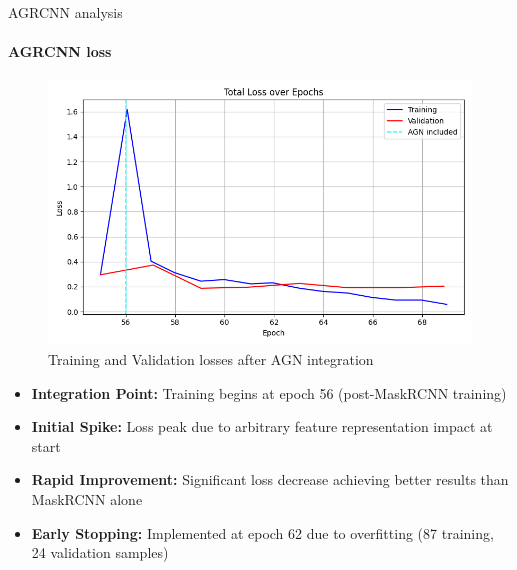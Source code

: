 \documentclass[8pt,aspectratio=169,xcolor=dvipsnames]{beamer}
\begin{document}
\begin{frame}{AGRCNN analysis}
\framesubtitle{AGRCNN loss}
\begin{figure}
    \centering
    \includegraphics[width=0.5\linewidth]{agn_loss.png}
    \caption{Training and Validation losses after AGN integration}
    \label{fig:agn_loss}
\end{figure}
\begin{itemize}
    \item \textbf{Integration Point:} Training begins at epoch 56 (post-MaskRCNN training)
    \item \textbf{Initial Spike:} Loss peak due to arbitrary feature representation impact at start
    \item \textbf{Rapid Improvement:} Significant loss decrease achieving better results than MaskRCNN alone
    \item \textbf{Early Stopping:} Implemented at epoch 62 due to overfitting (87 training, 24 validation samples)
\end{itemize}
\end{frame}
\end{document}
